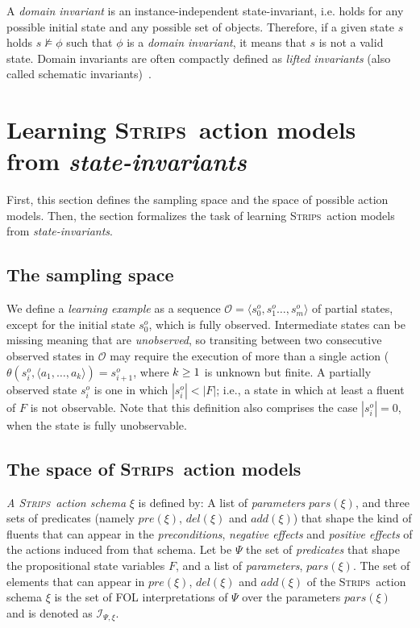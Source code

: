 \documentclass{article}
\newcommand{\tup}[1]{{\langle #1 \rangle}}
\newcommand{\strips}{\textsc{Strips}}
\begin{document}
A {\em domain invariant} is an instance-independent state-invariant, i.e. holds for any possible initial state and any possible set of objects. Therefore, if a given state $s$ holds $s\nvDash \phi$ such that $\phi$ is a {\em domain invariant}, it means that $s$ is not a valid state. Domain invariants are often compactly defined as {\em lifted invariants} (also called schematic invariants)~\cite{rintanen:schematicInvariants:AAAI2017}.



\section{Learning \strips\ action models from {\em state-invariants}}
\label{sec:learning}
First, this section defines the sampling space and the space of possible action models. Then, the section formalizes the task of learning \strips\ action models from {\em state-invariants}.

\subsection{The sampling space}
We define a {\em learning example} as a sequence $\mathcal{O}=\tup{s_0^o,s_1^o \ldots, s_m^o}$ of partial states, except for the initial state $s_0^o$, which is fully observed. Intermediate states can be missing meaning that are {\em unobserved}, so transiting between two consecutive observed states in $\mathcal{O}$ may require the execution of more than a single action ($\theta(s_i^o,\tup{a_1,\ldots,a_k})=s_{i+1}^o$, where ${\small k\geq 1}$ is unknown but finite. A partially observed state $s_i^o$ is one in which $|s_i^o| < |F|$; i.e., a state in which at least a fluent of $F$ is not observable. Note that this definition also comprises the case $|s_i^o| = 0$, when the state is fully unobservable.  

\subsection{The space of \strips\ action models}
{\em A \strips\ action schema} $\xi$ is defined by: A list of {\em parameters} $pars(\xi)$, and three sets of predicates (namely $pre(\xi)$, $del(\xi)$ and $add(\xi)$) that shape the kind of fluents that can appear in the {\em preconditions}, {\em negative effects} and {\em positive effects} of the actions induced from that schema. Let be $\Psi$ the set of {\em predicates} that shape the propositional state variables $F$, and a list of {\em parameters}, $pars(\xi)$. The set of elements that can appear in $pre(\xi)$, $del(\xi)$ and $add(\xi)$ of the \strips\ action schema $\xi$ is the set of FOL interpretations of $\Psi$ over the parameters $pars(\xi)$ and is denoted as ${\mathcal I}_{\Psi,\xi}$.
\end{document}
